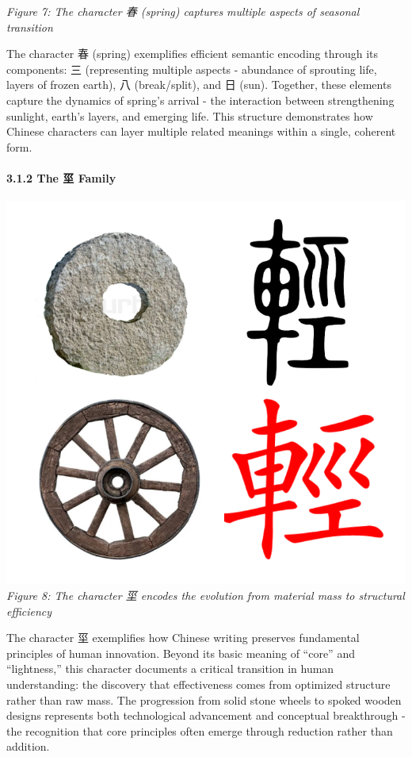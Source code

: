 \emph{Figure 7: The character 春 (spring) captures multiple aspects of
seasonal transition}

The character 春 (spring) exemplifies efficient semantic encoding
through its components: 三 (representing multiple aspects - abundance of
sprouting life, layers of frozen earth), 八 (break/split), and 日 (sun).
Together, these elements capture the dynamics of spring's arrival - the
interaction between strengthening sunlight, earth's layers, and emerging
life. This structure demonstrates how Chinese characters can layer
multiple related meanings within a single, coherent form.

\hypertarget{the-ux5759-family}{%
\paragraph{3.1.2 The 坙 Family}\label{the-ux5759-family}}

\includegraphics{./images/zi_stem.png} \emph{Figure 8: The character 坙
encodes the evolution from material mass to structural efficiency}

The character 坙 exemplifies how Chinese writing preserves fundamental
principles of human innovation. Beyond its basic meaning of ``core'' and
``lightness,'' this character documents a critical transition in human
understanding: the discovery that effectiveness comes from optimized
structure rather than raw mass. The progression from solid stone wheels
to spoked wooden designs represents both technological advancement and
conceptual breakthrough - the recognition that core principles often
emerge through reduction rather than addition.

